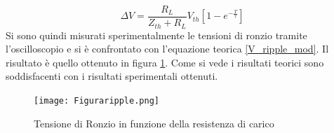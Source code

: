 \begin{equation}
	\Delta V = \frac{R_L}{Z_{th}+R_L}V_{th}\left[ 1-e^{-\frac{T}{\tau}}\right]
	\label{V_ripple_mod}
\end{equation}
Si sono quindi misurati sperimentalmente le tensioni di ronzio tramite l'oscilloscopio e si è confrontato con l'equazione teorica \ref{V_ripple_mod}. Il risultato è quello ottenuto in figura \ref{Figura ripple}.
Come si vede i risultati teorici sono soddisfacenti con i risultati sperimentali ottenuti.
\begin{figure}[h]
	\centering
	\texttt{[image: Figuraripple.png]}
	\caption{Tensione di Ronzio in funzione della resistenza di carico}
	\label{Figura ripple}
\end{figure}
